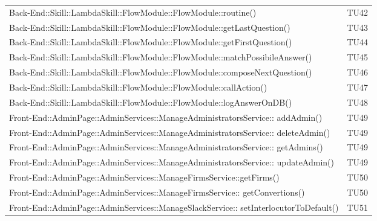 \documentclass[../PianoDiQualifica_v4.0.0.tex]{subfiles}
\begin{document}
\begin{longtable}[c] {>{\centering\arraybackslash}p{} >{\centering\arraybackslash}p{}}
 			\addlinespace[0.3em]
			\midrule
			\addlinespace[0.3em]
			Back-End::Skill::LambdaSkill::FlowModule::FlowModule::routine() & TU42 \\
			\addlinespace[0.3em]
			\midrule
			\addlinespace[0.3em]
 			Back-End::Skill::LambdaSkill::FlowModule::FlowModule::getLastQuestion() & TU43 \\
 			\addlinespace[0.3em]
			\midrule
			\addlinespace[0.3em]
 			Back-End::Skill::LambdaSkill::FlowModule::FlowModule::getFirstQuestion() & TU44 \\
 			\addlinespace[0.3em]
			\midrule
			\addlinespace[0.3em]
			Back-End::Skill::LambdaSkill::FlowModule::FlowModule::matchPossibileAnswer() & TU45 \\
			\addlinespace[0.3em]
			\midrule
			\addlinespace[0.3em]
			Back-End::Skill::LambdaSkill::FlowModule::FlowModule::composeNextQuestion() & TU46 \\
			\addlinespace[0.3em]
			\midrule
			\addlinespace[0.3em]
 			Back-End::Skill::LambdaSkill::FlowModule::FlowModule::callAction() & TU47 \\
 			\addlinespace[0.3em]
			\midrule
			\addlinespace[0.3em]
 			Back-End::Skill::LambdaSkill::FlowModule::FlowModule::logAnswerOnDB() & TU48 \\
 			\addlinespace[0.3em]
			\midrule
			\addlinespace[0.3em]
 			Front-End::AdminPage::AdminServices::ManageAdministratorsService:: addAdmin() & TU49 \\
 			\addlinespace[0.3em]
			\midrule
			\addlinespace[0.3em]
 			Front-End::AdminPage::AdminServices::ManageAdministratorsService:: deleteAdmin() & TU49 \\
 			\addlinespace[0.3em]
			\midrule
			\addlinespace[0.3em]
 			Front-End::AdminPage::AdminServices::ManageAdministratorsService:: getAdmins() & TU49 \\
 			\addlinespace[0.3em]
			\midrule
			\addlinespace[0.3em]
 			Front-End::AdminPage::AdminServices::ManageAdministratorsService:: updateAdmin() & TU49 \\
 			\addlinespace[0.3em]
			\midrule
			\addlinespace[0.3em]
 			Front-End::AdminPage::AdminServices::ManageFirmsService::getFirms() & TU50 \\
 			\addlinespace[0.3em]
			\midrule
			\addlinespace[0.3em]
 			Front-End::AdminPage::AdminServices::ManageFirmsService:: getConvertions() & TU50 \\
 			\addlinespace[0.3em]
			\midrule
			\addlinespace[0.3em]
 			Front-End::AdminPage::AdminServices::ManageSlackService:: setInterlocutorToDefault() & TU51 \\

\end{longtable}
\end{document}
